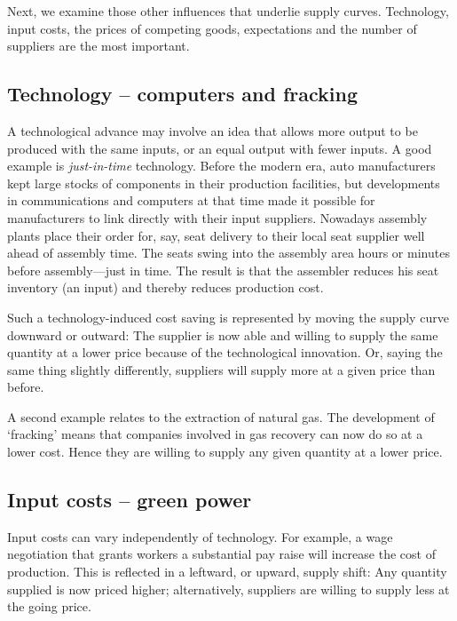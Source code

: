 Next, we examine those other influences that underlie supply curves.
Technology, input costs, the prices of competing goods, expectations and the
number of suppliers are the most important.

\newhtmlpage

\subsection*{Technology -- computers and fracking}

A technological advance may involve an idea that allows more output to be
produced with the same inputs, or an equal output with fewer inputs. A good
example is \textit{just-in-time} technology. Before the modern era, auto
manufacturers kept large stocks of components in their production
facilities, but developments in communications and computers at that time
made it possible for manufacturers to link directly with their input
suppliers. Nowadays assembly plants place their order for, say, seat
delivery to their local seat supplier well ahead of assembly time. The seats
swing into the assembly area hours or minutes before assembly---just in
time. The result is that the assembler reduces his seat inventory (an input)
and thereby reduces production cost.

Such a technology-induced cost saving is represented by moving the supply
curve downward or outward: The supplier is now able and willing to supply
the same quantity at a lower price because of the technological innovation.
Or, saying the same thing slightly differently, suppliers will supply more
at a given price than before.

A second example relates to the extraction of natural gas. The development
of `fracking' means that companies involved in gas recovery can now do so at
a lower cost. Hence they are willing to supply any given quantity at a lower
price.

\subsection*{Input costs -- green power}

Input costs can vary independently of technology. For example, a wage
negotiation that grants workers a substantial pay raise will increase the 
cost of production. This is reflected in a leftward, or
upward, supply shift: Any quantity supplied is now priced higher;
alternatively, suppliers are willing to supply less at the going price.

